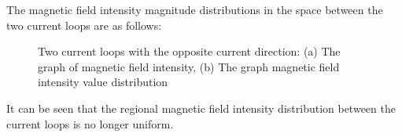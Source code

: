 \documentclass[journal,twocolumn,letterpaper]{IEEEJERM}
\begin{document}
The magnetic field intensity magnitude distributions in the space between the two current loops are as follows:
\begin{figure}[H]   
	\centering	  
	    \label{1a}\hfill	  
	\label{1b}
	\caption{Two current loops with the opposite current direction: (a) The graph of magnetic field intensity, (b) The graph magnetic field  intensity value distribution}	  
	\label{fig7} 
\end{figure}
It can be seen that the regional magnetic field intensity distribution between the current loops is no longer uniform.
\end{document}
